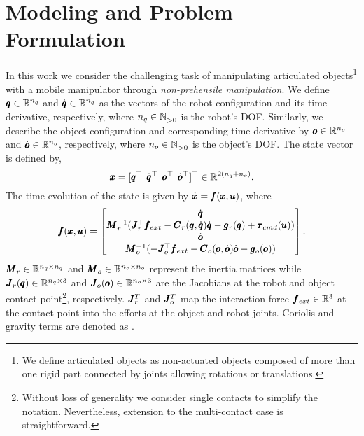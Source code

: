 \section{Modeling and Problem Formulation} \label{sec:formulation}

In this work we consider the challenging task of manipulating articulated objects\footnote{We define articulated objects as non-actuated objects composed of more than one rigid part connected by joints allowing rotations or translations.} with a mobile manipulator through \textit{non-prehensile manipulation}. We define $\pmb{q} \in \mathbb{R}^{n_q}$ and $\dot{\pmb{q}} \in \mathbb{R}^{n_q}$ as the vectors of the robot configuration and its time derivative, respectively, where $n_q \in \mathbb{N}^{}_{>0}$ is the robot's DOF.
Similarly, we describe the object configuration and corresponding time derivative by $\pmb{o} \in \mathbb{R}^{n_o}$ and $\dot{\pmb{o}} \in \mathbb{R}^{n_o}$, respectively, where $n_o \in \mathbb{N}^{}_{>0}$ is the object's DOF. The state vector is defined by,
\begin{equation}
    \pmb{x} = [\pmb{q}^\top \;\, 
      \dot{\pmb{q}}^\top \;\, 
      \pmb{o}^\top \;\,
      \dot{\pmb{o}}^\top ]^\top  \in \mathbb{R}^{2(n_q + n_o)}.
\end{equation}
The time evolution of the state is given by $\dot{\pmb{x}} = \pmb{f}(\pmb{x}, \pmb{u})$, where
\begin{equation} \label{eq:eom}
    \pmb{f}(\pmb{x}, \pmb{u}) =  
    \begin{bmatrix}
      \dot{\pmb{q}} \\
      \pmb{M}_r^{-1}(\pmb{J}_{r}^\top \pmb{f}_{ext} - \pmb{C}_r(\pmb{q}, \dot{\pmb{q}})\dot{\pmb{q}} - \pmb{g}_r(\pmb{q}) + \pmb{\tau}_{cmd}(\pmb{u})) \\
      \dot{\pmb{o}} \\
      \pmb{M}_o^{-1}(-\pmb{J}_{o}^\top \pmb{f}_{ext} - \pmb{C}_o(\pmb{o}, \dot{\pmb{o}})\dot{\pmb{o}} - \pmb{g}_o(\pmb{o}))
    \end{bmatrix}.
\end{equation}
$\pmb{M}_r \in \mathbb{R}^{n_q \times n_q}$ and $\pmb{M}_o \in \mathbb{R}^{n_o \times n_o}$ represent the inertia matrices while $\pmb{J}_r(\pmb{q}) \in \mathbb{R}^{n_q \times 3}$ and $\pmb{J}_o(\pmb{o}) \in \mathbb{R}^{n_o \times 3}$ are the Jacobians at the robot and object contact point\footnote{Without loss of generality we consider single contacts to simplify the notation. Nevertheless, extension to the multi-contact case is straightforward.}, respectively.
$\pmb{J}^T_r$ and $\pmb{J}^T_o$ map the interaction force $\pmb{f}_{ext} \in \mathbb{R}^{3}$ at the contact point into the efforts at the object and robot joints.  Coriolis and gravity terms are denoted as . 


